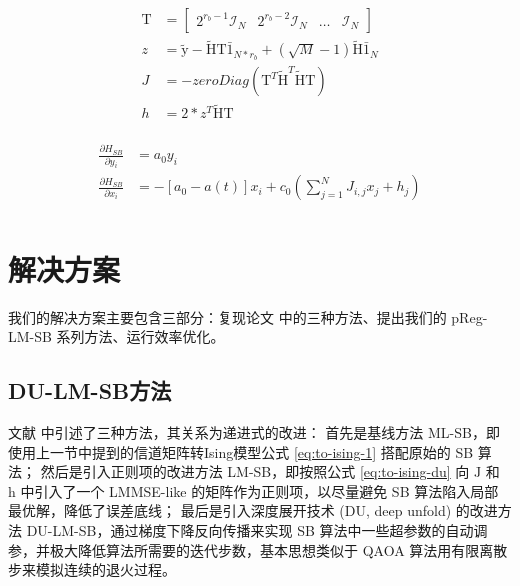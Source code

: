 \documentclass[withoutpreface,bwprint]{cumcmthesis}
\begin{document}
\begin{equation}
\begin{split}
\mathrm T &= \begin{bmatrix}
   2^{r_b-1} \mathcal I_N & 2^{r_b-2} \mathcal I_N & \dots & \mathcal I_N
\end{bmatrix} \\
z &= \tilde{\mathrm y} - \tilde{\mathrm H} \mathrm T \bar{1}_{N*r_b} + (\sqrt M - 1) \tilde{\mathrm H} \bar{1}_N \\
J &= -zeroDiag(\mathrm T^T \tilde{\mathrm H}^T \tilde{\mathrm H} \mathrm T) \\
h &= 2 * z^T \tilde{\mathrm H} \mathrm T \\
\end{split}
\label{eq:to-ising-1}
\end{equation}

\begin{equation}
\begin{split}
\frac{\partial H_{SB}}{\partial y_i} &= a_0 y_i \\
\frac{\partial H_{SB}}{\partial x_i} &= -[a_0 - a(t)] x_i + c_0 (\sum\limits_{j=1}^N J_{i,j} x_j + h_j) \\
\end{split}
\label{eq:sb}
\end{equation}


\section{解决方案}

我们的解决方案主要包含三部分：复现论文 \cite{Takabe2023} 中的三种方法、提出我们的 pReg-LM-SB 系列方法、运行效率优化。

\subsection{DU-LM-SB方法}

文献 \cite{Takabe2023} 中引述了三种方法，其关系为递进式的改进：
首先是基线方法 ML-SB，即使用上一节中提到的信道矩阵转Ising模型公式 \ref{eq:to-ising-1} 搭配原始的 SB 算法；
然后是引入正则项的改进方法 LM-SB，即按照公式 \ref{eq:to-ising-du} 向 $ \mathrm{J} $ 和 $ \mathrm{h} $ 中引入了一个 LMMSE-like 的矩阵作为正则项，以尽量避免 SB 算法陷入局部最优解，降低了误差底线；
最后是引入深度展开技术 (DU, deep unfold) 的改进方法 DU-LM-SB，通过梯度下降反向传播来实现 SB 算法中一些超参数的自动调参，并极大降低算法所需要的迭代步数，基本思想类似于 QAOA 算法用有限离散步来模拟连续的退火过程。
\end{document}
